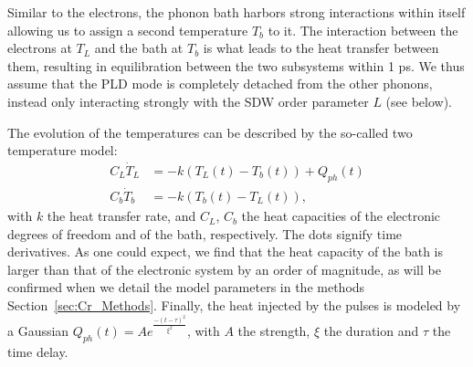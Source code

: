 Similar to the electrons, the phonon bath harbors strong interactions within itself allowing us to assign a second temperature $T_b$ to it.
The interaction between the electrons at $T_L$ and the bath at $T_b$ is what leads to the heat transfer between them, resulting in equilibration between the two subsystems within 1 ps.
We thus assume that the \gls{PLD} mode is completely detached from the other phonons, instead only interacting strongly with the \gls{SDW} order parameter $L$ (see below). 

The evolution of the temperatures can be described by the so-called two temperature model:
\begin{align}
	\label{eq:Cr_twotemp}
	C_L \dot{T}_L &= -k(T_L(t) - T_b(t)) + Q_{ph}(t) \\
	C_b \dot{T}_b &= -k(T_b(t) - T_L(t)),\nonumber
\end{align}
with $k$ the heat transfer rate, and $C_L$, $C_b$ the heat capacities of the electronic degrees of freedom and of the bath, respectively.
The dots signify time derivatives.
As one could expect, we find that the heat capacity of the bath is larger than that of the electronic system by an order of magnitude, as will be confirmed when we detail the model parameters in the methods Section~\ref{sec:Cr_Methods}.
Finally, the heat injected by the pulses is modeled by a Gaussian $Q_{ph}(t) = A e^{\frac{-(t - \tau)^2}{\xi^2}}$, with $A$ the strength, $\xi$ the duration and $\tau$ the time delay.


